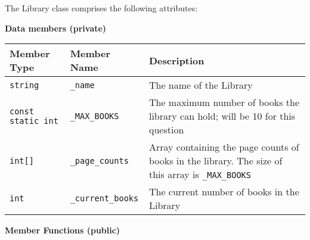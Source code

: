 The Library class comprises the following attributes:

\vspace{10pt}

\textbf{Data members (private)}

\renewcommand{\arraystretch}{1.5}
\begin{longtable}{|p{1.5in}|p{1.5in}|p{2.9in}|}
\hline
\textbf{Member Type} & \textbf{Member Name} & \textbf{Description} \\ \hline

\texttt{string} & \texttt{_name} & The name of the Library \\ \hline

\texttt{const static int} & \texttt{_MAX_BOOKS} & The maximum number of books the library can hold; will be 10 for this question \\ \hline

\texttt{int[]} & \texttt{_page_counts} & Array containing the page counts of books in the library. The size of this array is \texttt{_MAX_BOOKS} \\ \hline

\texttt{int} & \texttt{_current_books} & The current number of books in the Library \\ \hline

\end{longtable}

\textbf{Member Functions (public)}

